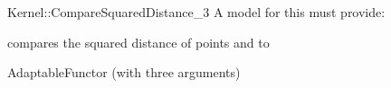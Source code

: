 \begin{ccRefFunctionObjectConcept}{Kernel::CompareSquaredDistance_3}
A model for this must provide:


      {compares the squared distance of points  and  to }

\ccRefines
AdaptableFunctor (with three arguments)

\ccSeeAlso
{} \\
 \\
 \\

\end{ccRefFunctionObjectConcept}
